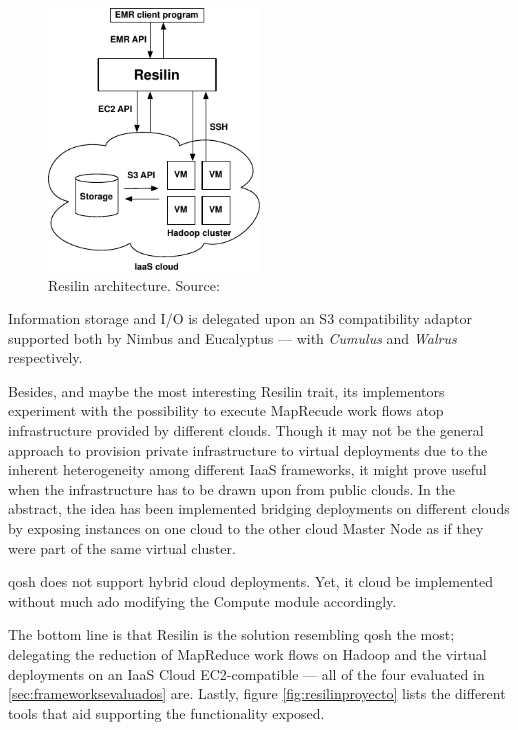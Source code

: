 \begin{figure}[tbp]
\begin{center}
\includegraphics[width=0.5\textwidth]{imagenes/035.pdf}
 \caption{Resilin architecture. Source: \cite{resilin}}
\label{fig:arquitecturaresilin}
\end{center}
\end{figure}

Information storage and I/O is delegated upon an S3 compatibility adaptor supported both by Nimbus and Eucalyptus --- with \emph{Cumulus} and \emph{Walrus} respectively.

Besides, and maybe the most interesting Resilin trait, its implementors experiment with the possibility to execute MapRecude work flows atop infrastructure provided by different clouds. Though it may not be the general approach to provision private infrastructure to virtual deployments due to the inherent heterogeneity among different IaaS frameworks, it might prove useful when the infrastructure has to be drawn upon from public clouds. In the abstract, the idea has been implemented bridging deployments on different clouds by exposing instances on one cloud to the other cloud Master Node as if they were part of the same virtual cluster.

qosh does not support hybrid cloud deployments. Yet, it cloud be implemented without much ado modifying the Compute module accordingly.

The bottom line is that Resilin is the solution resembling qosh the most; delegating the reduction of MapReduce work flows on Hadoop and the virtual deployments on an IaaS Cloud EC2-compatible --- all of the four evaluated in \ref{sec:frameworksevaluados} are. Lastly, figure \ref{fig:resilinproyecto} lists the different tools that aid supporting the functionality exposed.

